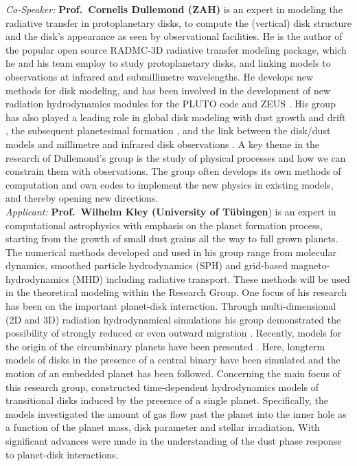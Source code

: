 \documentclass[10pt,fleqn,twoside]{article}
\begin{document}
{\it Co-Speaker:} {\bf Prof.\ Cornelis Dullemond (ZAH)} is an expert in modeling the radiative transfer in protoplanetary
disks, to compute the (vertical) disk structure and the disk's appearance as seen
by observational facilities. He is the author of the popular open source RADMC-3D 
radiative transfer modeling package, which he and his team employ to study
protoplanetary disks, and linking models to observations at infrared and submillimetre
wavelengths. He develops new methods for disk modeling, and has been involved
in the development of new radiation hydrodynamics modules for the PLUTO code
\citep{2010A&A...511A..81K} and ZEUS \citep{2015A&A...574A..81R}. His group has also played a
leading role in global disk modeling with dust growth and drift 
\citep[e.g.,][]{2008A&A...480..859B, 2008A&A...489..931Z, 2010A&A...513A..56G,
2010A&A...513A..57Z, 2009A&A...503L...5B, 2010A&A...513A..79B}, 
the subsequent planetesimal formation 
\citep[e.g.,][]{2010Icar..210..507O, 2012A&A...544L..16W, 2014A&A...572A..78D}, 
and the link between the disk/dust models and millimetre
and infrared disk observations 
\citep[e.g.,][]{2012A&A...538A.114P, 2013Sci...340.1199V,
2016ApJ...820...54K, 2016ApJ...831L..12K}. 
A key theme in the research of Dullemond's group is the study 
of physical processes and how we can constrain them with observations. The
group often develops its own methods of computation and own codes to implement
the new physics in existing models, and thereby opening new
directions. \\

{\it Applicant:} {\bf Prof.\ Wilhelm Kley (University of T\"ubingen}) is an expert in computational astrophysics with emphasis on the
planet formation process, starting from the growth of small dust grains all the way
to full grown planets. The numerical methods developed and used in his group range 
from molecular dynamics, smoothed particle hydrodynamics (SPH) and grid-based 
magneto-hydrodynamics (MHD) including radiative transport. These methods will be used
in the theoretical modeling within the Research Group.   
One focus of his research has been on the important planet-disk
interaction. Through multi-dimensional (2D and 3D) radiation hydrodynamical simulations
his group demonstrated the possibility of strongly reduced or even outward migration
\citep{2008A&A...487L...9K, 2009A&A...506..971K}. Recently, models for the origin of the
circumbinary planets have been presented \citep{2014A&A...564A..72K}. Here, longterm models of
disks in the presence of a central binary have been simulated and the motion of an embedded
planet has been followed. Concerning the main focus of this research group, 
\citet{2013A&A...560A..40M} constructed time-dependent hydrodynamics models of transitional disks induced by the
presence of a single planet. Specifically, the models investigated the amount of gas flow past
the planet into the inner hole as a function of the planet mass, disk
parameter and stellar irradiation. With \citet{2015A&A...584A.110P}
significant advances were made in the understanding of the dust phase
response to planet-disk interactions. \\
\end{document}
